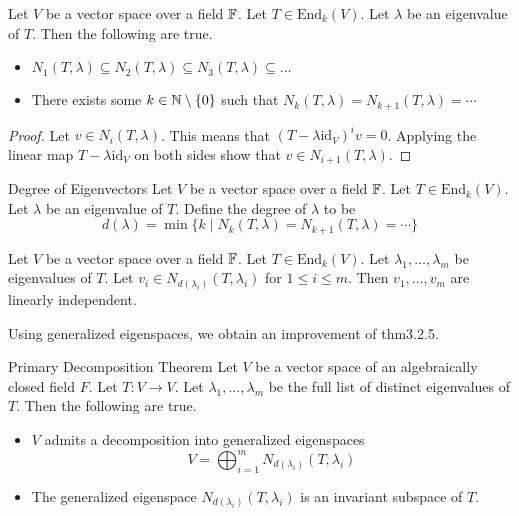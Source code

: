 \documentclass[a4paper]{article}
\begin{document}
\begin{prp}{}{} Let $V$ be a vector space over a field $\mathbb{F}$. Let $T\in\text{End}_k(V)$. Let $\lambda$ be an eigenvalue of $T$. Then the following are true. 
\begin{itemize}
\item $N_1(T,\lambda)\subseteq N_2(T,\lambda)\subseteq N_3(T,\lambda)\subseteq\dots$
\item There exists some $k\in\mathbb{N}\setminus\{0\}$ such that $N_k(T,\lambda)=N_{k+1}(T,\lambda)=\cdots$
\end{itemize} 
\begin{proof}
Let $v\in N_i(T,\lambda)$. This means that $(T-\lambda\text{id}_V)^iv=0$. Applying the linear map $T-\lambda\text{id}_V$ on both sides show that $v\in N_{i+1}(T,\lambda)$. 
\end{proof}
\end{prp}

\begin{defn}{Degree of Eigenvectors}{} Let $V$ be a vector space over a field $\mathbb{F}$. Let $T\in\text{End}_k(V)$. Let $\lambda$ be an eigenvalue of $T$. Define the degree of $\lambda$ to be $$d(\lambda)=\min\{k\;|\;N_k(T,\lambda)=N_{k+1}(T,\lambda)=\cdots\}$$
\end{defn}

\begin{prp}{}{} Let $V$ be a vector space over a field $\mathbb{F}$. Let $T\in\text{End}_k(V)$. Let $\lambda_1,\dots,\lambda_m$ be eigenvalues of $T$. Let $v_i\in N_{d(\lambda_i)}(T,\lambda_i)$ for $1\leq i\leq m$. Then $v_1,\dots,v_m$ are linearly independent. 
\end{prp}

Using generalized eigenspaces, we obtain an improvement of thm3.2.5. 

\begin{thm}{Primary Decomposition Theorem}{} Let $V$ be a vector space of an algebraically closed field $F$. Let $T:V\to V$. Let $\lambda_1,\dots,\lambda_m$ be the full list of distinct eigenvalues of $T$. Then the following are true. 
\begin{itemize}
\item $V$ admits a decomposition into generalized eigenspaces $$V=\bigoplus_{i=1}^mN_{d(\lambda_i)}(T,\lambda_i)$$
\item The generalized eigenspace $N_{d(\lambda_i)}(T,\lambda_i)$ is an invariant subspace of $T$. 
\end{itemize}
\end{thm}
\end{document}

